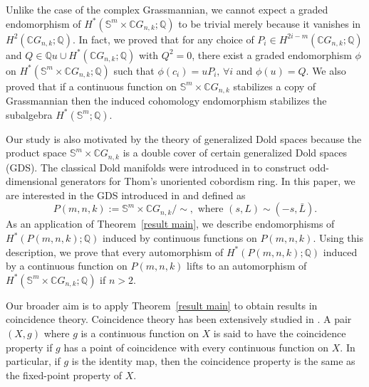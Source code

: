 \documentclass{amsart}
\newcommand{\thmref}[1]{Theorem~\ref{#1}}
\begin{document}
	Unlike %
the case of the complex Grassmannian, we cannot expect a graded
	endomorphism of $H^*(\mathbb S^m \times \mathbb CG_{n,k};\mathbb Q)$ to be
	trivial merely because it vanishes in $H^2(\mathbb{C}G_{n,k}; \mathbb{Q})$. 
	In fact, we proved that for any choice of $P_i \in H^{2i-m}(\mathbb{C}G_{n,k};\mathbb{Q})$ and $Q\in \mathbb Qu\cup  H^*(\mathbb CG_{n,k};\mathbb Q)$ with $Q^2=0$, there exist a graded endomorphism $\phi$ on $H^*(\mathbb S^m \times \mathbb CG_{n,k};\mathbb Q)$ such that $\phi(c_i) = uP_i, \, \forall i$ and $\phi(u)=Q$.
	We also proved that if a continuous function on $\mathbb S^m \times \mathbb CG_{n,k}$ stabilizes a copy of Grassmannian then the induced cohomology endomorphism stabilizes the subalgebra $H^*(\mathbb S^m ;\mathbb Q)$.
	
	Our study is also motivated by the theory of generalized Dold spaces because the product space $\mathbb S^m \times \mathbb CG_{n,k}$ is a double cover of certain  generalized Dold spaces (GDS). %
	The classical Dold manifolds were introduced in \cite{dold} to construct odd-dimensional generators for Thom's unoriented cobordism ring. In this paper, we are interested in the GDS introduced in \cite{nath-sankaran} and defined as  %
	\[
	P(m,n,k):=\mathbb S^m\times \mathbb CG_{n,k}/\!\!\sim, \text { where } (s,L)\sim (-s,\bar L).
	\]
	As an application of \thmref{result main}, we describe endomorphisms of $H^*(P(m,n,k);\mathbb{Q})$ induced by continuous functions on $P(m,n,k)$. Using this description, we prove that every automorphism of $H^*(P(m,n,k);\mathbb{Q})$ induced by a continuous function on $P(m,n,k)$ lifts to an automorphism of $H^*(\mathbb S^m\times \mathbb CG_{n,k}; \mathbb{Q})$ if $n>2$. 
	
	Our broader aim is to apply \thmref{result main} to obtain results in coincidence theory. Coincidence theory has been extensively studied in \cite{hoffman-noncoin, glover-homer coin, wong}. %
	A pair $(X,g)$ where $g$ is a continuous function on $X$ is said to have the coincidence property if $g$ has a point of coincidence with every continuous function on $X$. In particular, if $g$ is the identity map, then the coincidence property %
is the same as %
the fixed-point property of $X$.
	
\end{document}
